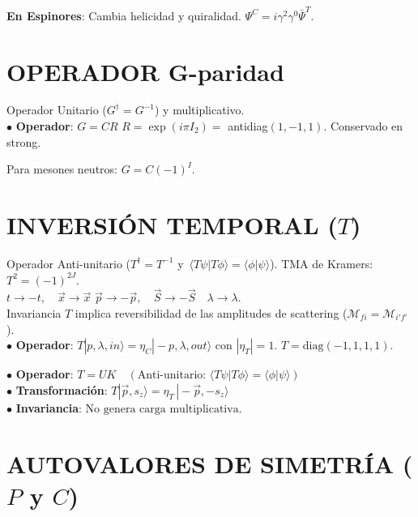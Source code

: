 \textbf{En Espinores}: Cambia helicidad y quiralidad. $\Psi^C = i\gamma^2 \gamma^0 \bar{\Psi}^T$.\\

\section{OPERADOR G-paridad}
Operador Unitario ($G^\dagger = G^{-1}$) y multiplicativo.\\

 $\bullet$ \textbf{Operador}: $G = CR$ \quad $R =\exp{(i\pi I_2)}=$ antidiag$(1,-1,1)$. Conservado en strong. 
 
 Para mesones neutros: $G= C(-1)^I$. 

\section{INVERSIÓN TEMPORAL ($T$)}
Operador Anti-unitario ($T^\dagger = T^{-1}$ y \,$\langle T\psi | T\phi \rangle = \langle \phi | \psi \rangle$). TMA de Kramers: $T^2 = (-1)^{2J}$.\\
$ t \to -t, \quad \vec{x} \to \vec{x} $ \quad $ \vec{p} \to -\vec{p}, \quad \vec{S} \to -\vec{S} \quad {\lambda} \to {\lambda}$.\\
Invariancia $T$ implica reversibilidad de las amplitudes de scattering ($\mathcal{M}_{fi} = \mathcal{M}_{i'f'}$).\\
$\bullet$ \textbf{Operador}: $ T|p, \lambda, in\rangle = \eta_C |-p, \lambda, out\rangle$ con $|\eta_T| = 1.$  \quad $T = \text{diag}(-1,1,1,1)$.

$\bullet$ \textbf{Operador}: $T = UK \quad (\text{Anti-unitario: } \langle T\psi | T\phi \rangle = \langle \phi | \psi \rangle)$ \\
$\bullet$ \textbf{Transformación}: $T|\vec{p}, s_z\rangle = \eta_T\,  |-\vec{p}, -s_z\rangle$ \\
$\bullet$ \textbf{Invariancia}: $\text{No genera carga multiplicativa.}$ \\

\section{AUTOVALORES DE SIMETRÍA ($P$ y $C$)}

